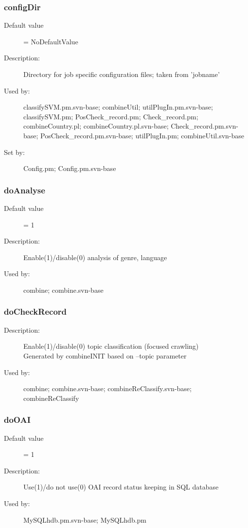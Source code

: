 \subsubsection{configDir}
\label{configDir}
\begin{description}
\item[Default value] = NoDefaultValue
\item[Description:] Directory for job specific configuration files; taken from 'jobname'
\item[Used by:] classifySVM.pm.svn-base; combineUtil; utilPlugIn.pm.svn-base; classifySVM.pm; PosCheck\_record.pm; Check\_record.pm; combineCountry.pl; combineCountry.pl.svn-base; Check\_record.pm.svn-base; PosCheck\_record.pm.svn-base; utilPlugIn.pm; combineUtil.svn-base
\item[Set by:] Config.pm; Config.pm.svn-base
\end{description}
\subsubsection{doAnalyse}
\label{doAnalyse}
\begin{description}
\item[Default value] = 1
\item[Description:] Enable(1)/disable(0) analysis of genre, language
\item[Used by:] combine; combine.svn-base
\end{description}
\subsubsection{doCheckRecord}
\label{doCheckRecord}
\begin{description}
\item[Description:] Enable(1)/disable(0) topic classification (focused crawling) \\ Generated by combineINIT based on --topic parameter
\item[Used by:] combine; combine.svn-base; combineReClassify.svn-base; combineReClassify
\end{description}
\subsubsection{doOAI}
\label{doOAI}
\begin{description}
\item[Default value] = 1
\item[Description:] Use(1)/do not use(0) OAI record status keeping in SQL database
\item[Used by:] MySQLhdb.pm.svn-base; MySQLhdb.pm
\end{description}
